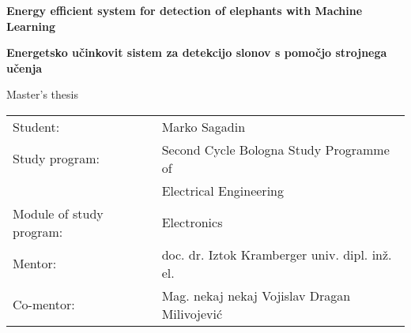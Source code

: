 \begin{center}

    \vspace*{4.0cm}
    \fontsize{26}{26}
    \selectfont
    \textbf{Energy efficient system for detection of elephants with Machine Learning}

    \vspace{1.0cm}

    \fontsize{26}{26}
    \selectfont
    \textbf{Energetsko učinkovit sistem za detekcijo slonov s pomočjo strojnega učenja}

    \vspace{0.5cm}

    \fontsize{16}{18}
    \selectfont
    Master's thesis

\end{center}

\vspace*{\fill}

\begin{tabular}{ l l }
    Student: & Marko Sagadin  \\ 
    Study program: & Second Cycle Bologna Study Programme of\\  
                   & Electrical Engineering \\
    Module of study program: & Electronics \\
    Mentor: & doc. dr. Iztok Kramberger univ. dipl. inž. el. \\
    Co-mentor: & Mag. nekaj nekaj Vojislav Dragan Milivojević \\
\end{tabular}

\newpage
